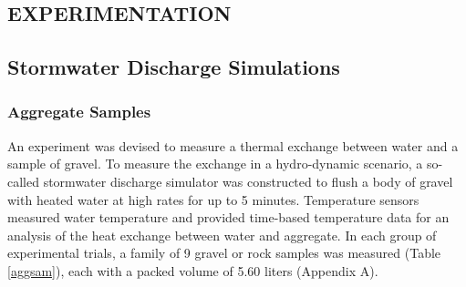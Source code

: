 

\begin{center}
\section{EXPERIMENTATION}
\end{center}

\subsection{Stormwater Discharge Simulations}

\subsubsection{Aggregate Samples}
An experiment was devised to measure a thermal exchange between water and a sample of gravel. To measure the exchange in a hydro-dynamic scenario, a so-called stormwater discharge simulator was constructed to flush a body of gravel with heated water at high rates for up to 5 minutes. Temperature sensors measured water temperature and provided time-based temperature data for an analysis of the heat exchange between water and aggregate. In each group of experimental trials, a family of 9 gravel or rock samples was measured (Table \ref{aggsam}), each with a packed volume of 5.60 liters (Appendix A). 

